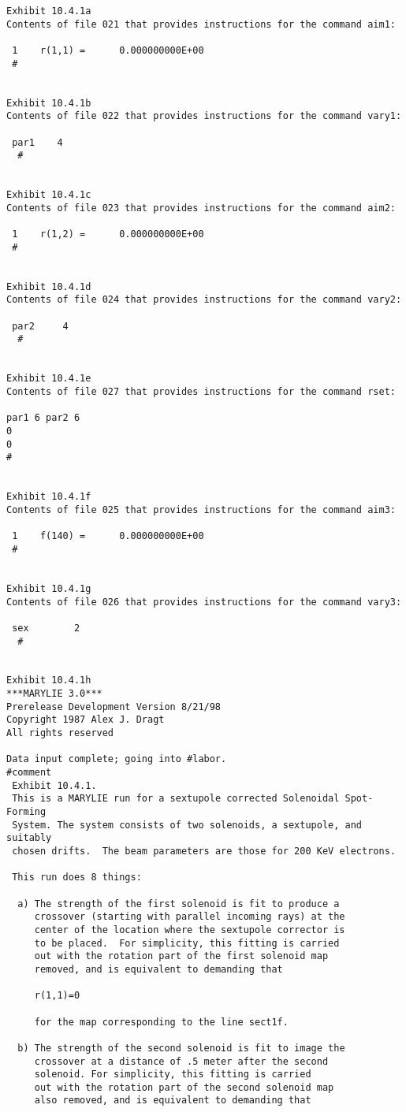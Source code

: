 \newpage
\begin{footnotesize}
\begin{verbatim}
Exhibit 10.4.1a
Contents of file 021 that provides instructions for the command aim1:

 1    r(1,1) =      0.000000000E+00
 #


Exhibit 10.4.1b
Contents of file 022 that provides instructions for the command vary1:

 par1    4
  #


Exhibit 10.4.1c
Contents of file 023 that provides instructions for the command aim2:

 1    r(1,2) =      0.000000000E+00
 #


Exhibit 10.4.1d
Contents of file 024 that provides instructions for the command vary2:

 par2     4
  #


Exhibit 10.4.1e
Contents of file 027 that provides instructions for the command rset:

par1 6 par2 6
0
0
#


Exhibit 10.4.1f
Contents of file 025 that provides instructions for the command aim3:

 1    f(140) =      0.000000000E+00
 #


Exhibit 10.4.1g
Contents of file 026 that provides instructions for the command vary3:

 sex        2
  #


Exhibit 10.4.1h
***MARYLIE 3.0***
Prerelease Development Version 8/21/98
Copyright 1987 Alex J. Dragt
All rights reserved

Data input complete; going into #labor.
#comment
 Exhibit 10.4.1.
 This is a MARYLIE run for a sextupole corrected Solenoidal Spot-Forming
 System. The system consists of two solenoids, a sextupole, and suitably
 chosen drifts.  The beam parameters are those for 200 KeV electrons.

 This run does 8 things:

  a) The strength of the first solenoid is fit to produce a
     crossover (starting with parallel incoming rays) at the
     center of the location where the sextupole corrector is
     to be placed.  For simplicity, this fitting is carried
     out with the rotation part of the first solenoid map
     removed, and is equivalent to demanding that

     r(1,1)=0

     for the map corresponding to the line sect1f.

  b) The strength of the second solenoid is fit to image the
     crossover at a distance of .5 meter after the second
     solenoid. For simplicity, this fitting is carried
     out with the rotation part of the second solenoid map
     also removed, and is equivalent to demanding that


\end{verbatim}
\end{footnotesize}
